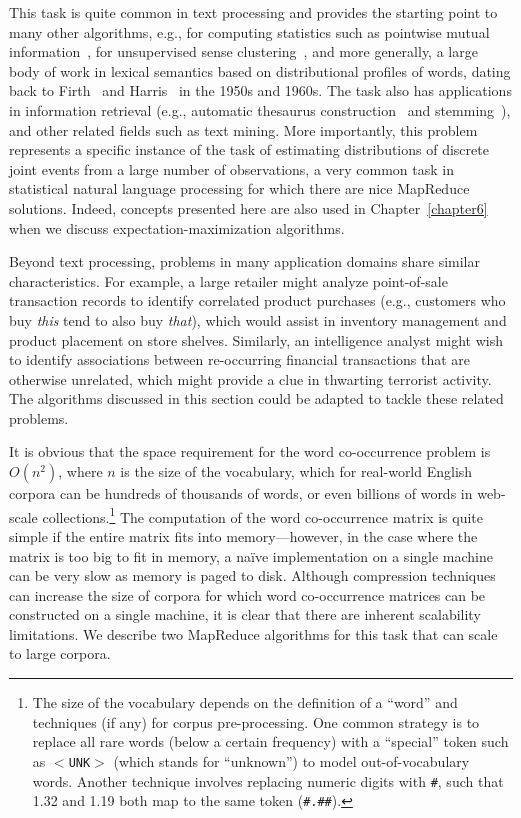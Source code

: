 This task is quite common in text processing and provides the starting
point to many other algorithms, e.g., for computing statistics such as
pointwise mutual information~\cite{Church_Hanks_1990}, for
unsupervised sense clustering~\cite{Schutze_CL1998}, and more
generally, a large body of work in lexical semantics based on
distributional profiles of words, dating back to
Firth~\cite{Firth_1957} and Harris~\cite{Harris_1968} in the 1950s and
1960s.  The task also has applications in information retrieval (e.g.,
automatic thesaurus construction~\cite{Schutze_Pedersen_IPM1997} and
stemming~\cite{Xu_Croft_TOIS1998}), and other related fields such as
text mining.  More importantly, this problem represents a specific
instance of the task of estimating distributions of discrete joint
events from a large number of observations, a very common task in
statistical natural language processing for which there are nice
MapReduce solutions.  Indeed, concepts presented here are also used in
Chapter~\ref{chapter6} when we discuss expectation-maximization
algorithms.

Beyond text processing, problems in many application domains share
similar characteristics.  For example, a large retailer might analyze
point-of-sale transaction records to identify correlated product
purchases (e.g., customers who buy \emph{this} tend to also buy \emph{
  that}), which would assist in inventory management and product
placement on store shelves.  Similarly, an intelligence analyst might
wish to identify associations between re-occurring financial
transactions that are otherwise unrelated, which might provide a clue
in thwarting terrorist activity.  The algorithms discussed in this
section could be adapted to tackle these related problems.

It is obvious that the space requirement for the word co-occurrence
problem is $O(n^2)$, where $n$ is the size of the vocabulary, which
for real-world English corpora can be hundreds of thousands of words,
or even billions of words in web-scale collections.\footnote{The size
  of the vocabulary depends on the definition of a ``word'' and
  techniques (if any) for corpus pre-processing.  One common strategy
  is to replace all rare words (below a certain frequency) with a
  ``special'' token such as \texttt{$<$UNK$>$} (which stands for
  ``unknown'') to model out-of-vocabulary words.  Another technique
  involves replacing numeric digits with \texttt{\#}, such that 1.32 and
  1.19 both map to the same token (\texttt{\#.\#\#}).}  The computation
of the word co-occurrence matrix is quite simple if the entire matrix
fits into memory---however, in the case where the matrix is too big to
fit in memory, a na\"{i}ve implementation on a single machine can be
very slow as memory is paged to disk.  Although compression techniques
can increase the size of corpora for which word co-occurrence matrices
can be constructed on a single machine, it is clear that there are
inherent scalability limitations.  We describe two MapReduce
algorithms for this task that can scale to large corpora.

